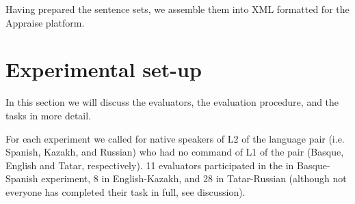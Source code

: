 \documentclass[11pt]{article}
\begin{document}
Having prepared the sentence sets, we assemble them into XML formatted for the Appraise platform.

%

\section{Experimental set-up}
\label{sec:setup}

In this section we will discuss the evaluators, the evaluation procedure, and the tasks in more detail.

For each experiment we called for native speakers of L2 of the language pair (i.e.
Spanish, Kazakh, and Russian) who had no command of L1 of the pair (Basque, English
and Tatar, respectively). 11 evaluators participated in the in Basque-Spanish experiment, 8 in
English-Kazakh, and 28 in Tatar-Russian (although not everyone has completed their task
in full, see discussion).
\end{document}
